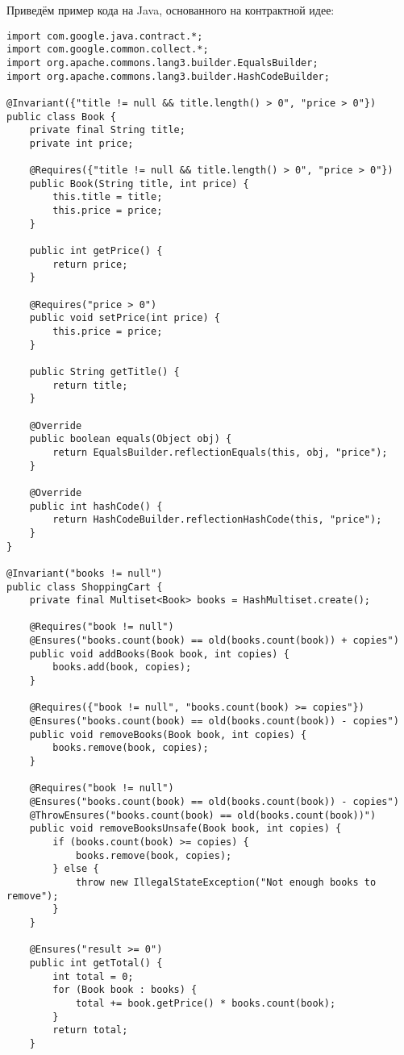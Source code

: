 Приведём пример кода на Java, основанного на контрактной идее:

\begin{lstlisting}
import com.google.java.contract.*;
import com.google.common.collect.*;
import org.apache.commons.lang3.builder.EqualsBuilder;
import org.apache.commons.lang3.builder.HashCodeBuilder;
 
@Invariant({"title != null && title.length() > 0", "price > 0"})
public class Book {
    private final String title;
    private int price;
 
    @Requires({"title != null && title.length() > 0", "price > 0"})
    public Book(String title, int price) {
        this.title = title;
        this.price = price;
    }
 
    public int getPrice() {
        return price;
    }
 
    @Requires("price > 0")
    public void setPrice(int price) {
        this.price = price;
    }
 
    public String getTitle() {
        return title;
    }
 
    @Override
    public boolean equals(Object obj) {
        return EqualsBuilder.reflectionEquals(this, obj, "price");
    }
 
    @Override
    public int hashCode() {
        return HashCodeBuilder.reflectionHashCode(this, "price");
    }
}

@Invariant("books != null")
public class ShoppingCart {
    private final Multiset<Book> books = HashMultiset.create();
 
    @Requires("book != null")
    @Ensures("books.count(book) == old(books.count(book)) + copies")
    public void addBooks(Book book, int copies) {
        books.add(book, copies);
    }
 
    @Requires({"book != null", "books.count(book) >= copies"})
    @Ensures("books.count(book) == old(books.count(book)) - copies")
    public void removeBooks(Book book, int copies) {
        books.remove(book, copies);
    }
 
    @Requires("book != null")
    @Ensures("books.count(book) == old(books.count(book)) - copies")
    @ThrowEnsures("books.count(book) == old(books.count(book))")
    public void removeBooksUnsafe(Book book, int copies) {
        if (books.count(book) >= copies) {
            books.remove(book, copies);
        } else {
            throw new IllegalStateException("Not enough books to remove");
        }
    }
 
    @Ensures("result >= 0")
    public int getTotal() {
        int total = 0;
        for (Book book : books) {
            total += book.getPrice() * books.count(book);
        }
        return total;
    }
 

\end{lstlisting}
